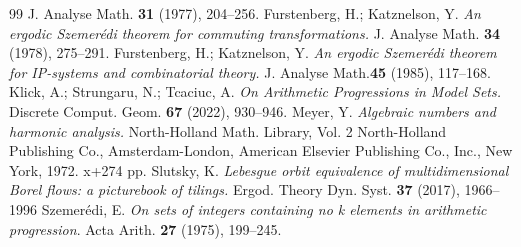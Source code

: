 \documentclass[12pt,reqno,a4paper]{amsart}
\numberwithin{equation}{section}
\theoremstyle{theorem}
\theoremstyle{task}
\theoremstyle{definition}
\begin{document}
\begin{thebibliography}{99}
J. Analyse Math. \textbf{31} (1977), 204--256.
Furstenberg, H.; Katznelson, Y.
\emph{An ergodic Szemer\'edi theorem for commuting transformations.}
J. Analyse Math. \textbf{34} (1978), 275--291.
Furstenberg, H.; Katznelson, Y.
\emph{An ergodic Szemer\'edi theorem for IP-systems and combinatorial theory.}
J. Analyse Math.\textbf{45} (1985), 117--168.
Klick, A.; Strungaru, N.; Tcaciuc, A. 
\emph{On Arithmetic Progressions in Model Sets.} 
Discrete Comput. Geom. \textbf{67} (2022), 930--946.
Meyer, Y.
\emph{Algebraic numbers and harmonic analysis.}
North-Holland Math. Library, Vol. 2
North-Holland Publishing Co., Amsterdam-London, American Elsevier Publishing Co., Inc., New York, 1972. x+274 pp.
Slutsky, K. 
\emph{Lebesgue orbit equivalence of multidimensional Borel flows: a picturebook of tilings.}
Ergod. Theory Dyn. Syst. \textbf{37} (2017), 1966--1996 
Szemer\'edi, E.
\emph{On sets of integers containing no k elements in arithmetic progression}.
Acta Arith. \textbf{27} (1975), 199--245.
\end{thebibliography}
\end{document}
